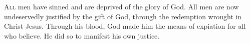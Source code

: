 
\lettrine{A}{ll} men have sinned and are deprived of the glory of God. All men are now undeservedly justified by the gift of God, through the redemption wrought in Christ Jesus. Through his blood, God made him the means of expiation for all who believe. He did so to manifest his own justice.